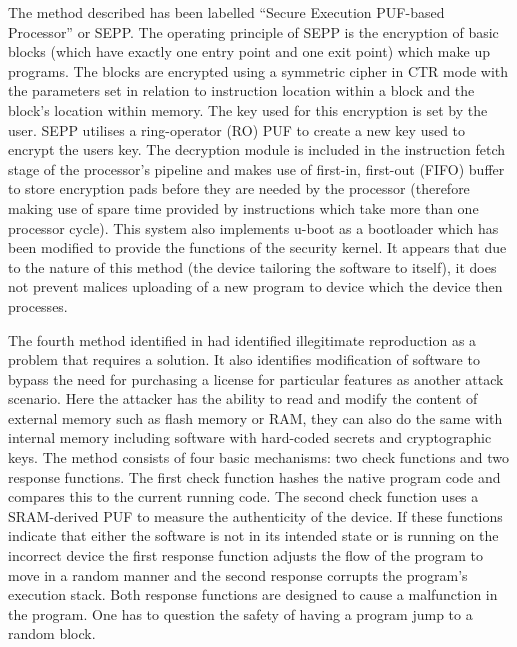 The method described has been labelled ``Secure Execution PUF-based Processor'' or SEPP. The operating principle of SEPP is the encryption of basic blocks (which have exactly one entry point and one exit point) which make up programs. The blocks are encrypted using a symmetric cipher in CTR mode with the parameters set in relation to instruction location within a block and the block's location within memory. The key used for this encryption is set by the user. SEPP utilises a ring-operator (RO) PUF to create a new key used to encrypt the users key. The decryption module is included in the instruction fetch stage of the processor's pipeline and makes use of first-in, first-out (FIFO) buffer to store encryption pads before they are needed by the processor (therefore making use of spare time provided by instructions which take more than one processor cycle). This system also implements u-boot as a bootloader which has been modified to provide the functions of the security kernel. It appears that due to the nature of this method (the device tailoring the software to itself), it does not prevent malices uploading of a new program to device which the device then processes.

\ifnotesincluded
{}
\fi


The fourth method identified in \cite{Kohnhauser2015} had identified illegitimate reproduction as a problem that requires a solution. It also identifies modification of software to bypass the need for purchasing a license for particular features as another attack scenario. Here the attacker has the ability to read and modify the content of external memory such as flash memory or RAM, they can also do the same with internal memory including software with hard-coded secrets and cryptographic keys. The method consists of four basic mechanisms: two check functions and two response functions. The first check function hashes the native program code and compares this to the current running code. The second check function uses a SRAM-derived PUF to measure the authenticity of the device. If these functions indicate that either the software is not in its intended state or is running on the incorrect device the first response function adjusts the flow of the program to move in a random manner and the second response corrupts the program's execution stack. Both response functions are designed to cause a malfunction in the program. One has to question the safety of having a program jump to a random block.


